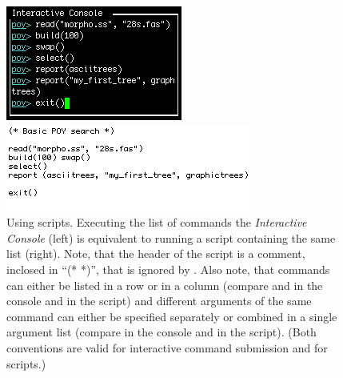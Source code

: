 \begin{figure}
\centering
\begin{minipage}[c]{0.42\textwidth}
   		\includegraphics[width=\textwidth]{figures/commandlist.jpg}
\end{minipage}
\quad
\begin{minipage}[c]{0.53\textwidth}
	   	\includegraphics[width=\textwidth]{figures/script.jpg}
   	\end{minipage}
\caption{Using \poy scripts. Executing the list of commands the \emph{Interactive Console} (left)  is equivalent to running a script containing the same list (right). Note, that the header of the script is a comment, inclosed in ``(* *)'', that is ignored by \poy. Also note, that commands can either be listed in a row or in a column (compare  and  in the console and in the script) and different arguments of the same command can either be specified separately or combined in a single argument list (compare  in the console and in the script). (Both conventions are valid for interactive command submission and for scripts.)}
\label{fig:script}
\end{figure}